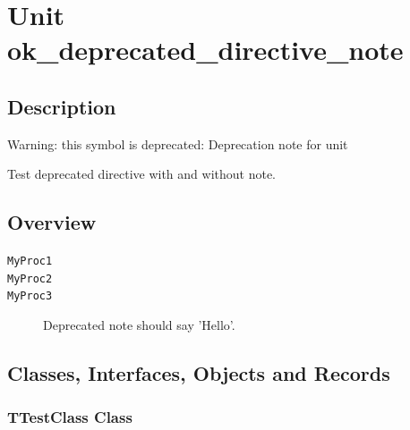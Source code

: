 \documentclass{report}
\newif\ifpdf
\begin{document}
\label{toc}\tableofcontents
\newpage
\newlength{\tmplength}
\chapter{Unit ok{\_}deprecated{\_}directive{\_}note}
\label{ok_deprecated_directive_note}
\section{Description}
Warning: this symbol is deprecated: Deprecation note for unit

Test deprecated directive with and without note.
\section{Overview}
\begin{description}
\item[\texttt{\begin{ttfamily}TTestClass\end{ttfamily} Class}]
\item[\texttt{\begin{ttfamily}TTestClassDeprecated1\end{ttfamily} Class}]
\item[\texttt{\begin{ttfamily}TTestClassDeprecated2\end{ttfamily} Class}]
\end{description}
\begin{description}
\item[\texttt{MyProc1}]
\item[\texttt{MyProc2}]
\item[\texttt{MyProc3}]Deprecated note should say 'Hello'.
\end{description}
\section{Classes, Interfaces, Objects and Records}
\ifpdf
\subsection*{\large{\textbf{TTestClass Class}}\normalsize\hspace{1ex}\hrulefill}
\else
\subsection*{TTestClass Class}
\fi
\label{ok_deprecated_directive_note.TTestClass}
\end{document}

